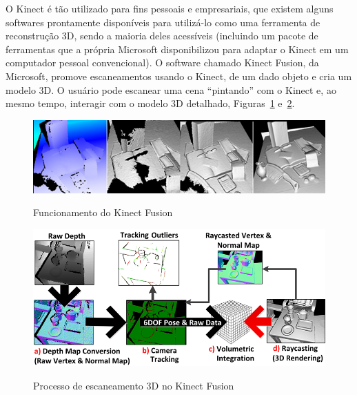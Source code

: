 O Kinect é tão utilizado para fins pessoais e empresariais, que existem alguns
softwares prontamente disponíveis para utilizá-lo como uma ferramenta de
reconstrução 3D, sendo a maioria deles acessíveis (incluindo um pacote de ferramentas que a própria
Microsoft disponibilizou para adaptar o Kinect em um computador pessoal convencional).
O software chamado Kinect Fusion, da Microsoft, promove escaneamentos usando o Kinect, de
um dado objeto e cria um modelo 3D.  O usuário pode escanear uma cena
``pintando'' com o Kinect e, ao mesmo tempo, interagir com o modelo 3D
detalhado, Figuras~\ref{fig:KinectFusionPipe} e~\ref{fig:KinectFusionPipe2}.

\begin{figure}[!h]
	\centering
	\caption{Funcionamento do Kinect Fusion}
		\includegraphics[width=1\linewidth]{figs/reconstrucaoKinectFusion.png}
   \label{fig:KinectFusionPipe}
\end{figure}

\newpage

\begin{figure}[!h]
	\centering
	\caption{Processo de escaneamento 3D no Kinect Fusion}
	\includegraphics[width=1\linewidth]{figs/kinectfusionpipeline.png}	
   \label{fig:KinectFusionPipe2}
\end{figure}

